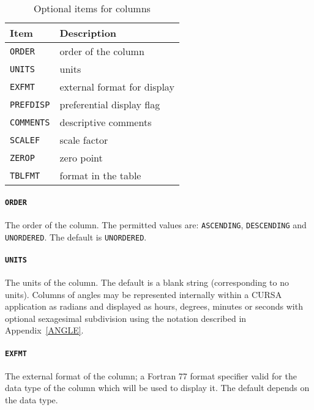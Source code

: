 \documentclass[twoside,11pt]{starlink}
\begin{document}
\begin{table}[htbp]

\begin{center}
\begin{tabular}{ll}
Item           & Description                         \\ \hline
\texttt{ORDER}    & order of the column                 \\
\texttt{UNITS}    & units                               \\
\texttt{EXFMT}    & external format for display         \\
\texttt{PREFDISP} & preferential display flag           \\
\texttt{COMMENTS} & descriptive comments                \\
\texttt{SCALEF}   & scale factor                        \\
\texttt{ZEROP}    & zero point                          \\
\texttt{TBLFMT}   & format in the table                 \\
\end{tabular}

\caption{Optional items for columns \label{COL_OPT} }

\end{center}
\end{table}

\paragraph{\texttt{ORDER}} The order of the column.  The permitted values
are: \texttt{ASCENDING}, \texttt{DESCENDING} and \texttt{UNORDERED}.  The default
is \texttt{UNORDERED}.

\paragraph{\texttt{UNITS}} The units of the column.  The default is a
blank string (corresponding to no units).  Columns of angles may be
represented internally within a CURSA application as radians and displayed
as hours, degrees, minutes or seconds with optional sexagesimal
subdivision using the notation described in Appendix~\ref{ANGLE}.

\paragraph{\texttt{EXFMT}}  The external format of the column; a Fortran 77
format specifier valid for the data type of the column which will be
used to display it.  The default depends on the data type.
\end{document}
